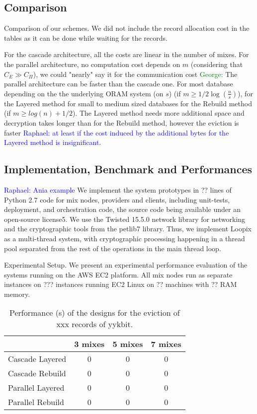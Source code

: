 \documentclass{llncs}
\newcommand{\raphael}[1]{\textcolor{blue}{Raphael: #1}}
\newcommand{\george}[1]{\textcolor{green}{George: #1}}
\begin{document}
\subsection{Comparison}\label{Comparison}
Comparison of our schemes.
We did not include the record allocation cost in the tables as it can be done while waiting for the records.

For the cascade architecture, all the costs are linear in the number of mixes.
For the parallel architecture, no computation cost depends on $m$ (considering that $C_E \gg C_{\Pi}$), we could "nearly" say it for the communication cost \george{}
The parallel architecture can be faster than the cascade one. For most database depending on the the underlying ORAM system (on $s$) (if $m \geq 1/2 \log(\frac{n}{s})$), for the Layered method for small to medium sized databases for the Rebuild method (if $m \geq log(n) +1/2$).
The Layered method needs more additional space and decryption takes longer than for the Rebuild method, however the eviction is faster \raphael{at least if the cost induced by the additional bytes for the Layered method is insignificant}.

\subsection{Implementation, Benchmark and Performances}\label{Implementation}

\raphael{Ania example} We implement the system prototypes in ?? lines of Python 2.7 code for mix nodes, providers and clients, including unit-tests, deployment, and orchestration code, the source code being available under an open-source license5. We use the Twisted 15.5.0 network library for networking and the cryptographic tools from the petlib7 library. Thus, we implement Loopix as a multi-thread system, with cryptographic processing happening in a thread pool separated from the rest of the operations in the main thread loop. 

Experimental Setup. We present an experimental performance evaluation of the systems running on the AWS EC2 platform. All mix nodes run as separate instances on ??? instances running EC2 Linux on ?? machines with ?? RAM memory. 
 
\begin{table}[H]
\centering
\begin{tabular}{l *3c}
\toprule
    					& 3 mixes	  	& 5 mixes		& 7 mixes	\\
\midrule
Cascade Layered  	& 0 				& 0 				& 0 			\\
Cascade Rebuild  	& 0 				& 0 				& 0 			\\
Parallel Layered 	& 0 				& 0 				& 0 			\\
Parallel Rebuild  	& 0 				& 0 				& 0 			\\
\bottomrule
\end{tabular}
\centering
\caption{Performance (s) of the designs for the eviction of xxx records of yykbit.}
\end{table}
\end{document}

